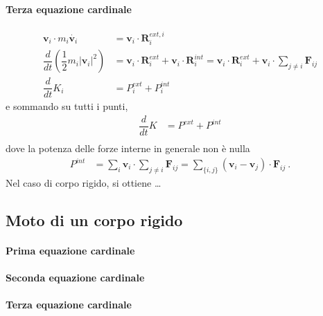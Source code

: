 \paragraph{Terza equazione cardinale}
\begin{equation}
\begin{aligned}
    \mathbf{v}_i \cdot m_i \dot{\mathbf{v}_i} & = \mathbf{v}_i \cdot \mathbf{R}_i^{ext,i} \\
    \dfrac{d}{d t} \left( \dfrac{1}{2} m_i |\mathbf{v}_i|^2  \right) & = \mathbf{v}_i \cdot \mathbf{R}_i^{ext} + \mathbf{v}_i \cdot \mathbf{R}_i^{int} =  \mathbf{v}_i \cdot \mathbf{R}_i^{ext} + \mathbf{v}_i \cdot \sum_{j \ne i} \mathbf{F}_{ij} \\
    \dfrac{d}{d t} K_i & = P_i^{ext} + P_i^{int}
\end{aligned}
\end{equation}
e sommando su tutti i punti,
\begin{equation}
\begin{aligned}
    \dfrac{d}{dt} K & = P^{ext} + P^{int} \\
\end{aligned}
\end{equation}
dove la potenza delle forze interne in generale non è nulla
\begin{equation}
\begin{aligned}
    P^{int} & =  \sum_i  \mathbf{v}_i \cdot  \sum_{j \ne i} \mathbf{F}_{ij} =  \sum_{\{i,j\}} ( \mathbf{v}_i - \mathbf{v}_j ) \cdot \mathbf{F}_{ij} \ .
\end{aligned}
\end{equation}
{\color{red} Nel caso di corpo rigido, si ottiene \dots}

\subsection{Moto di un corpo rigido}
\paragraph{Prima equazione cardinale}
\paragraph{Seconda equazione cardinale}
\paragraph{Terza equazione cardinale}



